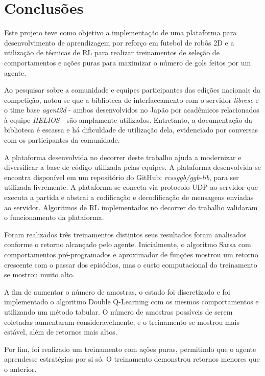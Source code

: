 
\chapter{Conclusões}
\label{chap:Conclusoes}
\par Este projeto teve como objetivo a implementação de uma plataforma para desenvolvimento de aprendizagem por reforço em futebol de robôs 2D e a utilização de técnicas de RL para realizar treinamentos de seleção de comportamentos e ações puras para maximizar o número de gols feitos por um agente.
\par Ao pesquisar sobre a comunidade e equipes participantes das edições nacionais da competição, notou-se que a biblioteca de interfaceamento com o servidor \textit{librcsc} e o time base \textit{agent2d} - ambos desenvolvidos no Japão por acadêmicos relacionados à equipe \textit{HELIOS} - são amplamente utilizados. Entretanto, a documentação da biblioteca é escassa e há dificuldade de utilização dela, evidenciado por conversas com os participantes da comunidade.
\par A plataforma desenvolvida no decorrer deste trabalho ajuda a modernizar e diversificar a base de código utilizada pelas equipes. A plataforma desenvolvida se encontra disponível em um repositório do GitHub: \textit{rcssggb/ggb-lib}, para ser utilizada livremente. A plataforma se conecta via protocolo UDP ao servidor que executa a partida e abstrai a codificação e decodificação de mensagens enviadas ao servidor. Algoritmos de RL implementados no decorrer do trabalho validaram o funcionamento da plataforma.
\par Foram realizados três treinamentos distintos seus resultados foram analisados conforme o retorno alcançado pelo agente. Inicialmente, o algoritmo Sarsa com comportamentos pré-programados e aproximador de funções mostrou um retorno crescente com o passar dos episódios, mas o custo computacional do treinamento se mostrou muito alto. 
\par A fim de aumentar o número de amostras, o estado foi discretizado e foi implementado o algoritmo Double Q-Learning com os mesmos comportamentos e utilizando um método tabular. O número de amostras possíveis de serem coletadas aumentaram consideravelmente, e o treinamento se mostrou mais estável, além de retornos mais altos.
\par Por fim, foi realizado um treinamento com ações puras, permitindo que o agente aprendesse estratégias por si só. O treinamento demonstrou retornos menores que o anterior.

